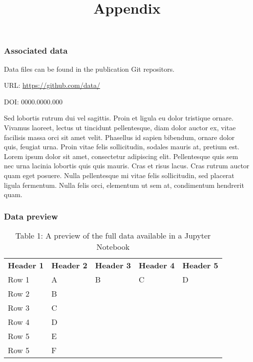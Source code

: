 \documentclass{article}
\begin{document}
\title{Appendix}

\maketitle


\subsubsection{Associated data}\label{H2118760}



Data files can be found in the publication Git repositors.


URL: \href{https://github.com/data/}{https://github.com/data/}


DOI: 0000.0000.000


Sed lobortis rutrum dui vel sagittis. Proin et ligula eu dolor tristique ornare. Vivamus laoreet, lectus ut tincidunt pellentesque, diam dolor auctor ex, vitae facilisis massa orci sit amet velit. Phasellus id sapien bibendum, ornare dolor quis, feugiat urna. Proin vitae felis sollicitudin, sodales mauris at, pretium est. Lorem ipsum dolor sit amet, consectetur adipiscing elit. Pellentesque quis sem nec urna lacinia lobortis quis quis mauris. Cras et risus lacus. Cras rutrum auctor quam eget posuere. Nulla pellentesque mi vitae felis sollicitudin, sed placerat ligula fermentum. Nulla felis orci, elementum ut sem at, condimentum hendrerit quam.


\subsubsection{Data preview}\label{H298432}



\begin{center}
\begin{table}
\caption*{Table 1: A preview of the full data available in a Jupyter Notebook}\label{T38376431}

\begin{tabu} to 0.75\textwidth { |X|X|X|X|X| }
\hline



\textbf{Header 1} & \textbf{Header 2} & \textbf{Header 3} & \textbf{Header 4} & \textbf{Header 5}
 \\


Row 1 & A & B & C & D
 \\


Row 2 & B &  &  & 
 \\


Row 3 & C &  &  & 
 \\


Row 4 & D &  &  & 
 \\


Row 5 & E &  &  & 
 \\


Row 5 & F &  &  & 
 \\
\hline

\end{tabu}\end{table}


\end{center}
\end{document}
